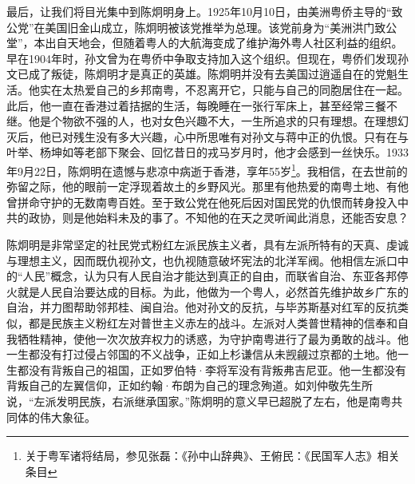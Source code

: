 最后，让我们将目光集中到陈炯明身上。1925年10月10日，由美洲粤侨主导的“致公党”在美国旧金山成立，陈炯明被该党推举为总理。该党前身为“美洲洪门致公堂”，本出自天地会，但随着粤人的大航海变成了维护海外粤人社区利益的组织。早在1904年时，孙文曾为在粤侨中争取支持加入这个组织。但现在，粤侨们发现孙文已成了叛徒，陈炯明才是真正的英雄。陈炯明并没有去美国过逍遥自在的党魁生活。他实在太热爱自己的乡邦南粤，不忍离开它，只能与自己的同胞居住在一起。此后，他一直在香港过着拮据的生活，每晚睡在一张行军床上，甚至经常三餐不继。他是个物欲不强的人，也对女色兴趣不大，一生所追求的只有理想。在理想幻灭后，他已对残生没有多大兴趣，心中所思唯有对孙文与蒋中正的仇恨。只有在与叶举、杨坤如等老部下聚会、回忆昔日的戎马岁月时，他才会感到一丝快乐。1933年9月22日，陈炯明在遗憾与悲凉中病逝于香港，享年55岁\footnote{关于粤军诸将结局，参见张磊：《孙中山辞典》、王俯民：《民国军人志》相关条目}。我相信，在去世前的弥留之际，他的眼前一定浮现着故土的乡野风光。那里有他热爱的南粤土地、有他曾拼命守护的无数南粤百姓。至于致公党在他死后因对国民党的仇恨而转身投入中共的政协，则是他始料未及的事了。不知他的在天之灵听闻此消息，还能否安息？

陈炯明是非常坚定的社民党式粉红左派民族主义者，具有左派所特有的天真、虔诚与理想主义，因而既仇视孙文，也仇视随意破坏宪法的北洋军阀。他相信左派口中的“人民”概念，认为只有人民自治才能达到真正的自由，而联省自治、东亚各邦停火就是人民自治要达成的目标。为此，他做为一个粤人，必然首先维护故乡广东的自治，并力图帮助邻邦桂、闽自治。他对孙文的反抗，与毕苏斯基对红军的反抗类似，都是民族主义粉红左对普世主义赤左的战斗。左派对人类普世精神的信奉和自我牺牲精神，使他一次次放弃权力的诱惑，为守护南粤进行了最为勇敢的战斗。他一生都没有打过侵占邻国的不义战争，正如上杉谦信从未觊觎过京都的土地。他一生都没有背叛自己的祖国，正如罗伯特·李将军没有背叛弗吉尼亚。他一生都没有背叛自己的左翼信仰，正如约翰·布朗为自己的理念殉道。如刘仲敬先生所说，“左派发明民族，右派继承国家。”陈炯明的意义早已超脱了左右，他是南粤共同体的伟大象征。









